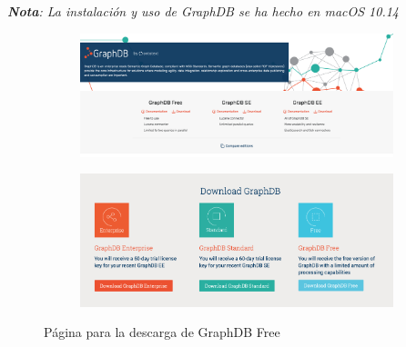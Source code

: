 
	
\textit{\textbf{Nota}: La instalación y uso de GraphDB se ha hecho en macOS 10.14}\\

\begin{figure}[H]
	\centering
	\begin{subfigure}[h]{0.78\textwidth} 
		\includegraphics[width=\textwidth]{imagenes/apendices/1}
		\caption{}
	\end{subfigure}       
	\begin{subfigure}[h]{0.78\textwidth} 
		\includegraphics[width=\textwidth]{imagenes/apendices/2}
		\caption{}
	\end{subfigure}
	\caption{Página para la descarga de GraphDB Free}
	\label{fig:1}
\end{figure}

